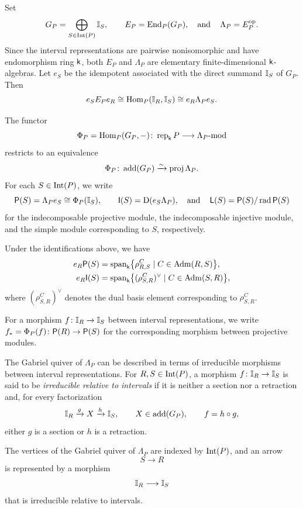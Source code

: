 \medskip
Set
\[
G_P=\bigoplus_{S\in\operatorname{Int}(P)}\mathbb I_S,
\qquad
E_P=\operatorname{End}_P(G_P),
\operatorname{\quad \text{and} \quad}\nolimits
\Lambda_P=E_P^{\mathrm{op}}.
\]
Since the interval representations are pairwise nonisomorphic and
have endomorphism ring $\mathsf{k}$, both $E_P$ and $\Lambda_P$ are
elementary finite-dimensional $\mathsf{k}$-algebras.
Let $e_S$ be the idempotent associated with the direct summand $\mathbb I_S$ of
$G_P$. Then
\[
e_SE_Pe_R\cong\operatorname{Hom}_P(\mathbb I_R,\mathbb I_S) \cong e_R\Lambda_Pe_S.
\]

The functor
\[
\Phi_P=\operatorname{Hom}_P(G_P,-)\colon
\operatorname{rep}_{\mathsf{k}} P\longrightarrow \Lambda_P\text{-mod}
\]
restricts to an equivalence
\[
\Phi_P\colon
\operatorname{add}(G_P)\xrightarrow{\sim}\operatorname{proj}\Lambda_P.
\]
For each $S\in\operatorname{Int}(P)$, we write
\[
\mathsf P(S)=\Lambda_Pe_S\cong\Phi_P(\mathbb I_S),
\qquad
\mathsf I(S)=\mathrm D(e_S\Lambda_P),
\operatorname{\quad \text{and} \quad}\nolimits
\mathsf L(S)=\mathsf P(S)/\operatorname{rad}\mathsf P(S)
\]
for the indecomposable projective module, the indecomposable injective
module, and the simple module corresponding to $S$, respectively.

Under the identifications above, we have
\begin{equation}
\begin{aligned}
e_R\mathsf P(S)
&=
\operatorname{span}_{\mathsf{k}}
\bigl\{\rho_{R,S}^{C}\mid C\in\operatorname{Adm}(R,S)\bigr\},\\
e_R\mathsf I(S)
&=
\operatorname{span}_{\mathsf{k}}
\bigl\{(\rho_{S,R}^{C})^\vee\mid C\in\operatorname{Adm}(S,R)\bigr\},
\end{aligned}
\label{eq:projective-injective-component-bases}
\end{equation}
where $(\rho_{S,R}^{C})^\vee$ denotes the dual basis element
corresponding to $\rho_{S,R}^{C}$.


For a morphism
$f\colon\mathbb I_R\to \mathbb I_S$
between interval representations, we write
$f_{*}
=
\Phi_P(f)
\colon
\mathsf P(R)\to\mathsf P(S)$ for the corresponding morphism between projective modules.



\medskip
The Gabriel quiver of $\Lambda_P$ can be described in terms of
irreducible morphisms between interval representations. For
$R,S\in\operatorname{Int}(P)$, a morphism
$f\colon \mathbb I_R\to\mathbb I_S$
is said to be \emph{irreducible relative to intervals} if it is neither
a section nor a retraction and, for every factorization
\[
\mathbb I_R
\xrightarrow{g}
X
\xrightarrow{h}
\mathbb I_S,
\qquad
X\in\operatorname{add}(G_P),
\qquad
f=h\circ g,
\]
either $g$ is a section or $h$ is a retraction.

The vertices of the Gabriel quiver of $\Lambda_P$ are indexed by
$\operatorname{Int}(P)$, and an arrow
\[
S\longrightarrow R
\]
is represented by a morphism
\[
\mathbb I_R\longrightarrow\mathbb I_S
\]
that is irreducible relative to intervals. 

